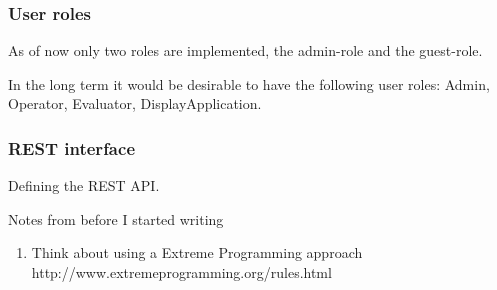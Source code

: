 \subsubsection{User roles}

As of now only two roles are implemented, the admin-role and the guest-role.



In the long term it would be desirable to have the following user roles: Admin, Operator, Evaluator, DisplayApplication.



\subsubsection{REST interface}

Defining the REST API. 


Notes from before I started writing
\begin{enumerate}
\item Think about using a Extreme Programming approach http://www.extremeprogramming.org/rules.html
\end{enumerate}